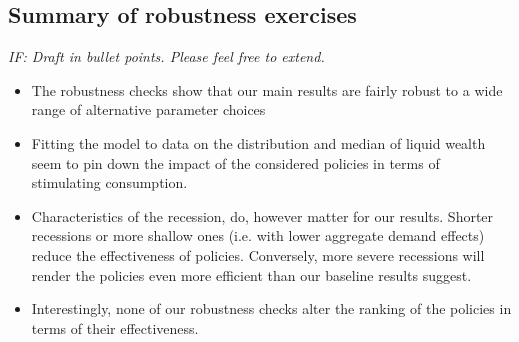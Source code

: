 \documentclass[../HAFiscal]{subfiles}
\begin{document}
\FloatBarrier
\subsection{Summary of robustness exercises}
\label{sec:robust_summary}

\textit{IF: Draft in bullet points. Please feel free to extend.}
\begin{itemize}
	\item The robustness checks show that our main results are fairly robust to a wide range of alternative parameter choices
	\item Fitting the model to data on the distribution and median of liquid wealth seem to pin down the impact of the considered policies in terms of stimulating consumption.
	\item Characteristics of the recession, do, however matter for our results. Shorter recessions or more shallow ones (i.e. with lower aggregate demand effects) reduce the effectiveness of policies. Conversely, more severe recessions will render the policies even more efficient than our baseline results suggest.
	\item Interestingly, none of our robustness checks alter the ranking of the policies in terms of their effectiveness. 
\end{itemize}
\end{document}
